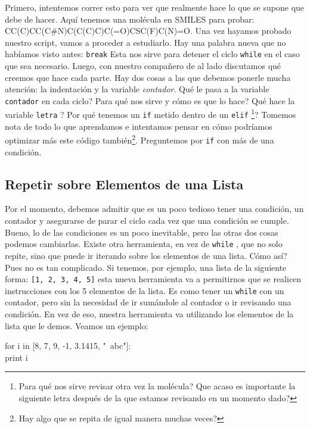 \documentclass[10pt,letterpaper]{article}
\newcommand{\inlinecode}[1]{
\colorbox{light-gray}{\texttt{#1}}
}
\newenvironment{Code}
{
\begin{lrbox}{\selvestebox}%
\begin{minipage}{\dimexpr\columnwidth-2\fboxsep\relax}
\fontfamily{\ttdefault}\selectfont
}
{\end{minipage}\end{lrbox}%
\begin{center}
\colorbox{light-gray}{\usebox{\selvestebox}}
\end{center}
}
\begin{document}
Primero, intentemos correr esto para ver que realmente hace lo que se supone que debe de hacer. Aqu\'i tenemos una mol\'ecula en SMILES para probar: CC(C)CC(C\#N)C(C(C)C)C(=O)CSC(F)C(N)=O. Una vez hayamos probado nuestro script, vamos a proceder a estudiarlo. Hay una palabra nueva que no hab\'iamos visto antes: \inlinecode{break} Esta nos sirve para detener el ciclo \inlinecode{while} en el caso que sea necesario. Luego, con nuestro compa\~nero de al lado discutamos qu\'e creemos que hace cada parte. Hay dos cosas a las que debemos ponerle mucha atenci\'on: la indentaci\'on y la variable \emph{contador}. Qu\'e le pasa a la variable \inlinecode{contador} en cada ciclo? Para qu\'e nos sirve y c\'omo es que lo hace? Qu\'e hace la variable \inlinecode{letra}? Por qu\'e tenemos un \inlinecode{if} metido dentro de un \inlinecode{elif}\footnote{Para qu\'e nos sirve revisar otra vez la mol\'ecula? Que acaso es importante la siguiente letra despu\'es de la que estamos revisando en un momento dado?}? Tomemos nota de todo lo que aprendamos e intentamos pensar en c\'omo podr\'iamos optimizar m\'as este c\'odigo tambi\'en\footnote{Hay algo que se repita de igual manera muchas veces?}. Preguntemos por \inlinecode{if} con m\'as de una condici\'on.

\subsection{Repetir sobre Elementos de una Lista}
Por el momento, debemos admitir que es un poco tedioso tener una condici\'on, un contador y asegurarse de parar el ciclo cada vez que una condici\'on se cumple. Bueno, lo de las condiciones es un poco inevitable, pero las otras dos cosas podemos cambiarlas. Existe otra herramienta, en vez de \inlinecode{while}, que no solo repite, sino que puede ir iterando sobre los elementos de una lista. C\'omo as\'i? Pues no es tan complicado. Si tenemos, por ejemplo, una lista de la siguiente forma: \inlinecode{[1, 2, 3, 4, 5]} esta nueva herramienta va a permitirnos que se realicen instrucciones con los 5 elementos de la lista. Es como tener un \inlinecode{while} con un contador, pero sin la necesidad de ir sum\'andole al contador o ir revisando una condici\'on. En vez de eso, nuestra herramienta va utilizando los elementos de la lista que le demos. Veamos un ejemplo:

\begin{Code}
for i in [8, 7, 9, -1, 3.1415, "\ \hspace*{-2mm}abc"]:\\
\hspace*{5mm}print i
\end{Code}
\end{document}
